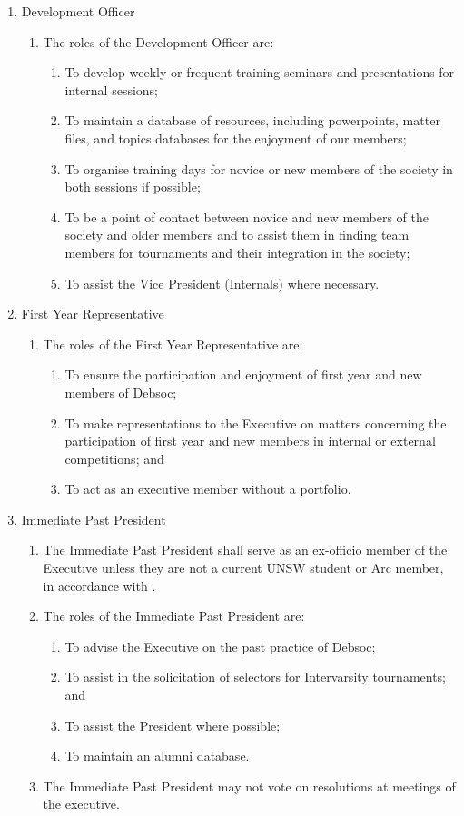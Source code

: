 \begin{enumerate}
\item Development Officer
  \begin{enumerate}
  \item The roles of the Development Officer are:
    \begin{enumerate}
    \item To develop weekly or frequent training seminars and presentations for internal sessions;
    \item To maintain a database of resources, including powerpoints, matter files, and topics databases for the enjoyment of our members;
    \item To organise training days for novice or new members of the society in both sessions if possible;
    \item To be a point of contact between novice and new members of the society and older members and to assist them in finding team members for tournaments and their integration in the society;
    \item To assist the Vice President (Internals) where necessary.
    \end{enumerate}
  \end{enumerate}

\item First Year Representative
  \begin{enumerate}
  \item The roles of the First Year Representative are:
    \begin{enumerate}
    \item To ensure the participation and enjoyment of first year and new members of Debsoc;
    \item To make representations to the Executive on matters concerning the participation of first year and new members in internal or external competitions; and
    \item To act as an executive member without a portfolio.
    \end{enumerate}
  \end{enumerate}

\item Immediate Past President
  \begin{enumerate}
  \item The Immediate Past President shall serve as an ex-officio member of the Executive unless they are not a current UNSW student or Arc member, in accordance with .
  \item The roles of the Immediate Past President are:
    \begin{enumerate}
    \item To advise the Executive on the past practice of Debsoc;
    \item To assist in the solicitation of selectors for Intervarsity tournaments; and
    \item To assist the President where possible;
    \item To maintain an alumni database.
    \end{enumerate}
  \item The Immediate Past President may not vote on resolutions at meetings of the executive.
  \end{enumerate}


\end{enumerate}
